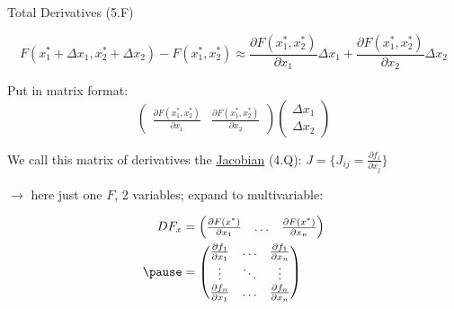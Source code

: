 \documentclass[xcolor=dvipsnames, compress, t]{beamer}
\begin{document}
\begin{frame}{Total Derivatives (5.F)}

{\color{Orchid} $$F(x_1^* + \Delta x_1, x_2^*+ \Delta x_2) - F(x_1^*, x_2^*) \approx \frac{\partial F(x_1^*, x_2^*)}{\partial x_1} \Delta x_1 + \frac{\partial F(x_1^*, x_2^*)}{\partial x_2} \Delta x_2$$} 

Put in matrix format: 
$$\begin{pmatrix} \frac{\partial F(x_1^*, x_2^*)}{\partial x_1} & \frac{\partial F(x_1^*, x_2^*)}{\partial x_2} \end{pmatrix} \begin{pmatrix} \Delta x_1 \\ \Delta x_2 \end{pmatrix}$$

We call this matrix of derivatives the \underline{Jacobian} (4.Q): $J = \{J_{ij} = \frac{\partial f_i}{\partial x_j}\}$ \pause

$\rightarrow$ here just one $F$, 2 variables; expand to multivariable:

\begin{equation*}
\begin{aligned}
D F_x &= \begin{pmatrix} \frac{\partial F(x^*)}{\partial x_1} & \hdots & \frac{\partial F(x^*)}{\partial x_n} \end{pmatrix} \\ \pause
&= \begin{pmatrix} \frac{\partial f_1}{\partial x_1} & \hdots & \frac{\partial f_1}{\partial x_n} \\
\vdots & \ddots & \vdots \\
\frac{\partial f_n}{\partial x_1} & \hdots & \frac{\partial f_n}{\partial x_n} \end{pmatrix}
\end{aligned}
\end{equation*}

\end{frame}
\end{document}
